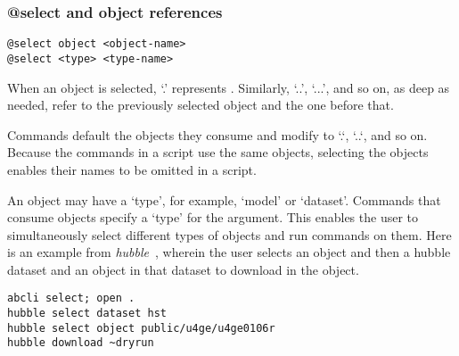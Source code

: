 \subsubsection{@select and object references}
\label{select}

\begin{verbatim}
@select object <object-name>
@select <type> <type-name>
\end{verbatim}

When an object is selected, `.' represents . Similarly, `..', `...', and so on, as deep as needed, refer to the previously selected object and the one before that.

Commands default the objects they consume and modify to `.`, `..`, and so on. Because the commands in a script use the same objects, selecting the objects enables their names to be omitted in a script.

An object may have a `type', for example, `model' or `dataset'. Commands that consume objects specify a `type' for the argument. This enables the user to simultaneously select different types of objects and run commands on them. Here is an example from \emph{hubble}~, wherein the user selects an object and then a hubble dataset and an object in that dataset to download in the object.

\begin{verbatim}
abcli select; open .
hubble select dataset hst
hubble select object public/u4ge/u4ge0106r
hubble download ~dryrun
\end{verbatim}